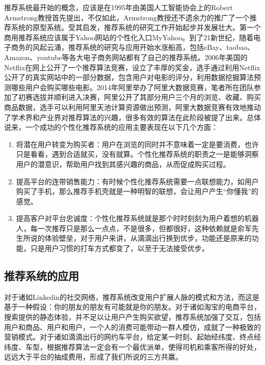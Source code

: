 	推荐系统最开始的概念，应该是在1995年由美国人工智能协会\citep{recmd-history}上的Robert Armstrong教授首先提出，不仅如此，Armstrong教授还不遗余力的推广了一个推荐系统的原型系统。受其启发，推荐系统的研究工作开始起步并发展壮大。第一个商用推荐系统应该属于Yahoo网站的个性化入口MyYahoo。到了21新世纪，随着电子商务的风起云涌，推荐系统的研究与应用开始水涨船高，包括eBay、taobao、Amazon、youtube\citep{recmd-youtube}等各大电子商务网站都有了自己的推荐系统。2006年美国的Netflix\citep{recmd-netflix}在网上公开了一个推荐算法竞赛，设立了丰厚的奖金，选手通过利用Netflix公开了的真实网站中的一部分数据，包含用户对电影的评分，利用数据挖掘算法预测哪些用户会购买哪些电影。2014年阿里举办了阿里大数据竞赛，笔者所在团队参加了初赛选拔并顺利进入决赛，阿里公开了其部分用户三个月的浏览、收藏、购买商品数据，选手可以利用阿里天池计算资源做出预测，阿里大数据竞赛有效地推动了学术界和产业界对推荐算法的兴趣，很多有效的算法在此阶段被提了出来。总体说来，一个成功的个性化推荐系统的应用主要表现在以下几个方面：
		\begin{enumerate}[(1)]
		\item 将潜在用户转变为购买者：用户在浏览的同时并不意味着一定是要消费，也许只是看看，遇到合适就买，没有就算。个性化推荐系统的职责之一是能够洞察用户的潜意识，帮助用户找到其感兴趣的商品，从而促成购买过程。
		\item 提高平台的连带销售能力：有时候个性化推荐系统需要一点联想能力，如用户购买了手机，那么推荐手机壳就是一种明智的联想，会让用户产生“你懂我”的感觉。
		\item 提高客户对平台忠诚度：个性化推荐系统就是那个时时刻刻为用户着想的机器人，每一次推荐只是那么一点点，不是很多，但都很好，这种依赖就是俞军先生所说的体验壁垒，对于用户来讲，从滴滴出行换到优步，功能还是原来的功能，只是用户习惯的打车方式都变了，以至于无法接受优步。
		\end{enumerate}

	\subsection{推荐系统的应用}
	对于诸如Linkedin的社交网络，推荐系统改变用户扩展人脉的模式和方法，而这是基于一种假设：你的朋友的朋友有可能就是你的朋友。对于诸如淘宝的电商平台，搜索提供的静态体验，并不足以让用户产生购买欲望，推荐系统加强了交互，包括用户和商品、用户和用户，一个人的消费可能带动一群人模仿，成就了一种极致的营销模式\citep{user-interest}。对于诸如滴滴出行的网约车平台，给定某一时刻、起始经纬度、终点经纬度、车型，根据推荐算法一定会有一个最优派单，使得司机和乘客所得的好处，远远大于平台的抽成费用，形成了我们所说的三方共赢。


